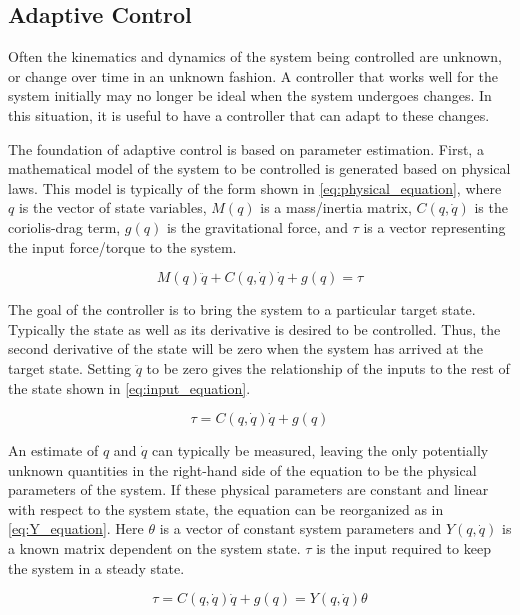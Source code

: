 \documentclass[letterpaper, 10 pt, conference]{ieeeconf}  %
\begin{document}
\subsection{Adaptive Control}

Often the kinematics and dynamics of the system being controlled are unknown, or change over time in an unknown fashion. 
A controller that works well for the system initially may no longer be ideal when the system undergoes changes. 
In this situation, it is useful to have a controller that can adapt to these changes.

The foundation of adaptive control is based on parameter estimation.
First, a mathematical model of the system to be controlled is generated based on physical laws.
This model is typically of the form shown in \eqref{eq:physical_equation}, where $q$ is the vector of state variables, $M(q)$ is a mass/inertia matrix, $C(q,\dot{q})$ is the coriolis-drag term, $g(q)$ is the gravitational force, and $\tau$ is a vector representing the input force/torque to the system.

\begin{equation} \label{eq:physical_equation}
M(q)\ddot{q} + C(q,\dot{q})\dot{q} + g(q) = \tau
\end{equation}

The goal of the controller is to bring the system to a particular target state.
Typically the state as well as its derivative is desired to be controlled.
Thus, the second derivative of the state will be zero when the system has arrived at the target state.
Setting $\ddot{q}$ to be zero gives the relationship of the inputs to the rest of the state shown in \eqref{eq:input_equation}.

\begin{equation} \label{eq:input_equation}
\tau = C(q,\dot{q})\dot{q} + g(q)
\end{equation}

An estimate of $q$ and $\dot{q}$ can typically be measured, leaving the only potentially unknown quantities in the right-hand side of the equation to be the physical parameters of the system.
If these physical parameters are constant and linear with respect to the system state, the equation can be reorganized as in \eqref{eq:Y_equation}.
Here $\theta$ is a vector of constant system parameters and $Y(q,\dot{q})$ is a known matrix dependent on the system state. 
$\tau$ is the input required to keep the system in a steady state.

\begin{equation} \label{eq:Y_equation}
\tau = C(q,\dot{q})\dot{q} + g(q) = Y(q,\dot{q})\theta
\end{equation}
\end{document}
